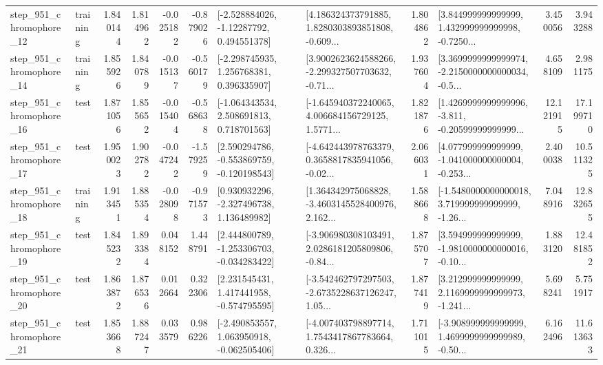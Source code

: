 \begin{tabular}{llrrrrllrlrr}
  step\_951\_chromophore\_12 &  training &      1.840144 &    1.814962 &     -0.025182 & -0.879026 &    [-2.528884026, -1.12287792, 0.494551378] &  [4.186324373791885, 1.8280303893851808, -0.609... &       1.804862 &  [3.844999999999999, 1.432999999999998, -0.7250... &            3.450056 &          3.943288 \\
  step\_951\_chromophore\_14 &  training &      1.855926 &    1.840789 &     -0.015137 & -0.560179 &    [-2.298745935, 1.256768381, 0.396335907] &  [3.9002623624588266, -2.299327507703632, -0.71... &       1.937604 &  [3.3699999999999974, -2.2150000000000034, -0.5... &            4.658109 &          2.981175 \\
  step\_951\_chromophore\_16 &      test &      1.871056 &    1.855652 &     -0.015404 & -0.568638 &    [-1.064343534, 2.508691813, 0.718701563] &  [-1.645940372240065, 4.006684156729125, 1.5771... &       1.821876 &  [1.4269999999999996, -3.811, -0.20599999999999... &           12.121915 &         17.199710 \\
  step\_951\_chromophore\_17 &      test &      1.950023 &    1.902782 &     -0.047242 & -1.579259 &   [2.590294786, -0.553869759, -0.120198543] &  [-4.642443978763379, 0.3658817835941056, -0.02... &       2.066031 &  [4.077999999999999, -1.041000000000004, -0.253... &            2.400038 &         10.511325 \\
  step\_951\_chromophore\_18 &  training &      1.913451 &    1.885354 &     -0.028098 & -0.971573 &    [0.930932296, -2.327496738, 1.136489982] &  [1.364342975068828, -3.4603145528400976, 2.162... &       1.588668 &  [-1.5480000000000018, 3.719999999999999, -1.26... &            7.048916 &         12.832655 \\
  step\_951\_chromophore\_19 &      test &      1.845232 &    1.893384 &      0.048152 &  1.448791 &   [2.444800789, -1.253306703, -0.034283422] &  [-3.906980308103491, 2.0286181205809806, -0.84... &       1.875707 &  [3.594999999999999, -1.9810000000000016, -0.10... &            1.883120 &         12.481852 \\
  step\_951\_chromophore\_20 &      test &      1.863872 &    1.876536 &      0.012664 &  0.322306 &    [2.231545431, 1.417441958, -0.574795595] &  [-3.542462797297503, -2.6735228637126247, 1.05... &       1.877419 &  [3.212999999999999, 2.1169999999999973, -1.241... &            5.698241 &          5.751917 \\
  step\_951\_chromophore\_21 &      test &      1.853668 &    1.887247 &      0.033579 &  0.986226 &   [-2.490853557, 1.063950918, -0.062505406] &  [-4.007403798897714, 1.7543417867783664, 0.326... &       1.711015 &  [-3.908999999999999, 1.4699999999999989, -0.50... &            6.162496 &         11.613633 \\

\end{tabular}
